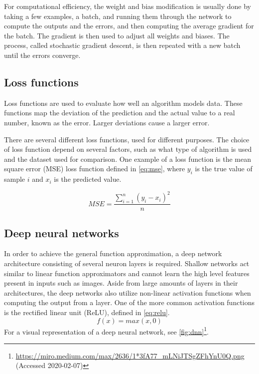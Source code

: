 \documentclass{kththesis}
\begin{document}
For computational efficiency, the weight and bias modification is usually done by taking a few examples, a batch, and running them through the network to compute the outputs and the errors, and then computing the average gradient for the batch. The gradient is then used to adjust all weights and biases. The process, called stochastic gradient descent, is then repeated with a new batch until the errors converge. \parencite{bottou2010large}

\subsection{Loss functions}
\label{sec:loss}
Loss functions are used to evaluate how well an algorithm models data. These functions map the deviation of the prediction and the actual value to a real number, known as the error. Larger deviations cause a larger error.

There are several different loss functions, used for different purposes. The choice of loss function depend on several factors, such as what type of algorithm is used and the dataset used for comparison. One example of a loss function is the mean square error (MSE) loss function defined in \autoref{eq:mse}, where $y_i$ is the true value of sample $i$ and $x_i$ is the predicted value. \parencite{CommonLo62:online}

\begin{equation}
\label{eq:mse}
MSE = \frac{\sum_{i=1}^n (y_i - x_i)^2}{n}
\end{equation}

\subsection{Deep neural networks}
In order to achieve the general function approximation, a deep network architecture consisting of several neuron layers is required. Shallow networks act similar to linear function approximators and cannot learn the high level features present in inputs such as images. Aside from large amounts of layers in their architectures, the deep networks also utilize non-linear activation functions when computing the output from a layer. One of the more common activation functions is the rectified linear unit (ReLU), defined in \autoref{eq:relu}.
\begin{equation}
\label{eq:relu}
f(x) = max(x, 0)
\end{equation}
For a visual representation of a deep neural network, see \autoref{fig:dnn}\footnote{\url{https://miro.medium.com/max/2636/1*3fA77_mLNiJTSgZFhYnU0Q.png} (Accessed 2020-02-07)}.
\end{document}
